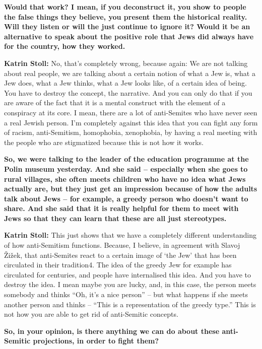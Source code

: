 \textbf{Would that work? I mean, if you deconstruct it, you show to people the false things they believe, you present them the historical reality. Will they listen or will the just continue to ignore it? Would it be an alternative to speak about the positive role that Jews did always have for the country, how they worked.} 

\textbf{Katrin Stoll:} No, that’s completely wrong, because again:  We are not talking about real people, we are talking about a certain notion of what a Jew is, what a Jew does, what a Jew thinks, what a Jew looks like, of a certain idea of being.  You have to destroy the concept, the narrative. And you can only do that if you are aware of the fact that it is a mental construct with the element of a conspiracy at its core. I mean, there are a lot of anti-Semites who have never seen a real Jewish person. I’m completely against this idea that you can fight any form of racism, anti-Semitism, homophobia, xenophobia, by having a real meeting with the people who are stigmatized because this is not how it works. 

\textbf{So, we were talking to the leader of the education programme at the Polin museum yesterday. And she said – especially when she goes to rural villages, she often meets children who have no idea what Jews actually are, but they just get an impression because of how the adults talk about Jews – for example, a greedy person who doesn’t want to share. And she said that it is really helpful for them to meet with Jews so that they can learn that these are all just stereotypes.} 

\textbf{Katrin Stoll:} This just shows that we have a completely different understanding of how anti-Semitism functions. Because, I believe, in agreement with Slavoj Žižek, that anti-Semites react to a certain image of ‘the Jew’ that has been circulated in their tradition4. The idea of the greedy Jew for example has circulated for centuries, and people have internalised this idea. And you have to destroy the idea. I mean maybe you are lucky, and, in this case, the person meets somebody and thinks "`Oh, it’s a nice person"' – but what happens if she meets another person and thinks – "`This is a representation of the greedy type."' This is not how you are able to get rid of anti-Semitic concepts. 

\textbf{So, in your opinion, is there anything we can do about these anti-Semitic projections, in order to fight them?} 

